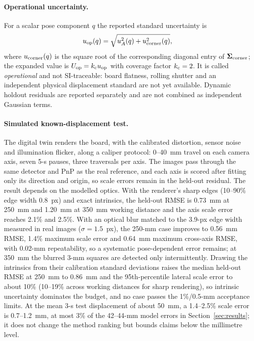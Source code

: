 \paragraph{Operational uncertainty.}
For a scalar pose component $q$ the reported standard uncertainty is
\begin{equation}
 u_{\rm op}(q)=\sqrt{u_A^2(q)+u_{\rm corner}^2(q)}, \label{eq:uncertainty}
\end{equation}
where $u_{\rm corner}(q)$ is the square root of the corresponding diagonal
entry of $\boldsymbol\Sigma_{\rm corner}$; the expanded value is
$U_{\rm op}=k_{\rm c}u_{\rm op}$ with coverage factor $k_{\rm c}=2$. It is called
\emph{operational} and not SI-traceable: board flatness, rolling shutter and
an independent physical displacement standard are not yet available. Dynamic
holdout residuals are reported separately and are not combined as independent
Gaussian terms.

\paragraph{Simulated known-displacement test.}
The digital twin renders the board, with the calibrated distortion, sensor
noise and illumination flicker, along a caliper protocol: 0--40~mm travel on
each camera axis, seven 5-s pauses, three traversals per axis. The images pass
through the same detector and PnP as the real reference, and each axis is
scored after fitting only its direction and origin, so scale errors remain in
the held-out residual. The result depends on the modelled optics. With the
renderer's sharp edges (10--90\% edge width 0.8~px) and exact intrinsics, the
held-out RMSE is 0.73~mm at 250~mm and 1.20~mm at 350~mm working distance and
the axis scale error reaches 2.1\% and 2.5\%. With an optical blur matched to
the 3.9-px edge width measured in real images ($\sigma=1.5$~px), the 250-mm
case improves to 0.56~mm RMSE, 1.4\% maximum scale error and 0.64~mm maximum
cross-axis RMSE, with 0.02-mm repeatability, so a systematic pose-dependent
error remains; at 350~mm the blurred $3$-mm squares are detected only
intermittently. Drawing the intrinsics from their calibration standard
deviations raises the median held-out RMSE at 250~mm to 0.86~mm and the
95th-percentile lateral scale error to about 10\% (10--19\% across working
distances for sharp rendering), so intrinsic uncertainty dominates the budget,
and no case passes the 1\%/0.5-mm acceptance limits. At the mean 3-s test
displacement of about 50~mm, a 1.4--2.5\% scale error is 0.7--1.2~mm, at most
3\% of the 42--44-mm model errors in Section~\ref{sec:results}; it does not
change the method ranking but bounds claims below the millimetre level.
